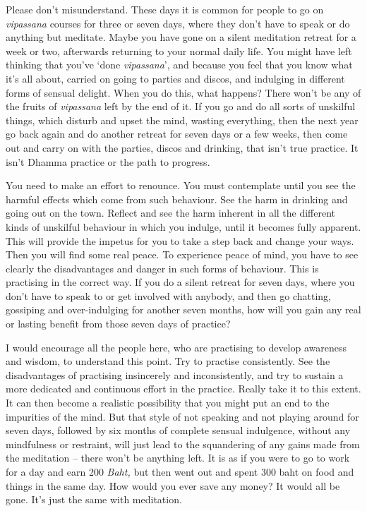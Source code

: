 Please don't misunderstand. These days it is common for people to go on \textit{vipassana} courses for three or seven days, where they don't have to speak or do anything but meditate. Maybe you have gone on a silent meditation retreat for a week or two, afterwards returning to your normal daily life. You might have left thinking that you've `done \textit{vipassana}', and because you feel that you know what it's all about, carried on going to parties and discos, and indulging in different forms of sensual delight. When you do this, what happens? There won't be any of the fruits of \textit{vipassana} left by the end of it. If you go and do all sorts of unskilful things, which disturb and upset the mind, wasting everything, then the next year go back again and do another retreat for seven days or a few weeks, then come out and carry on with the parties, discos and drinking, that isn't true practice. It isn't Dhamma practice or the path to progress.

You need to make an effort to renounce. You must contemplate until you see the harmful effects which come from such behaviour. See the harm in drinking and going out on the town. Reflect and see the harm inherent in all the different kinds of unskilful behaviour in which you indulge, until it becomes fully apparent. This will provide the impetus for you to take a step back and change your ways. Then you will find some real peace. To experience peace of mind, you have to see clearly the disadvantages and danger in such forms of behaviour. This is practising in the correct way. If you do a silent retreat for seven days, where you don't have to speak to or get involved with anybody, and then go chatting, gossiping and over-indulging for another seven months, how will you gain any real or lasting benefit from those seven days of practice?

I would encourage all the people here, who are practising to develop awareness and wisdom, to understand this point. Try to practise consistently. See the disadvantages of practising insincerely and inconsistently, and try to sustain a more dedicated and continuous effort in the practice. Really take it to this extent. It can then become a realistic possibility that you might put an end to the impurities of the mind. But that style of not speaking and not playing around for seven days, followed by six months of complete sensual indulgence, without any mindfulness or restraint, will just lead to the squandering of any gains made from the meditation -- there won't be anything left. It is as if you were to go to work for a day and earn 200 \textit{Baht,} but then went out and spent 300 baht on food and things in the same day. How would you ever save any money? It would all be gone. It's just the same with meditation.

